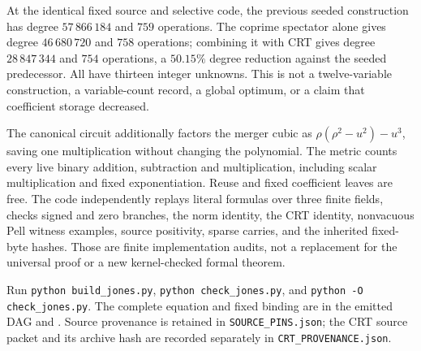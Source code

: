 At the identical fixed source and selective code, the previous seeded
construction has degree $57\,866\,184$ and $759$ operations. The coprime
spectator alone gives degree $46\,680\,720$ and $758$ operations; combining
it with CRT gives degree $28\,847\,344$ and $754$ operations, a $50.15\%$
degree reduction against the seeded predecessor. All have thirteen integer
unknowns. This is not a twelve-variable construction, a variable-count
record, a global optimum, or a claim that coefficient storage decreased.

The canonical circuit additionally factors the merger cubic as
$\rho(\rho^2-u^2)-u^3$, saving one multiplication without changing the
polynomial. The metric counts every live binary addition, subtraction and
multiplication, including scalar multiplication and fixed exponentiation.
Reuse and fixed coefficient leaves are free. The code independently replays
literal formulas over three finite fields, checks signed and zero branches,
the norm identity, the CRT identity, nonvacuous Pell witness examples, source
positivity, sparse carries, and the inherited fixed-byte hashes. Those are
finite implementation audits, not a replacement for the universal proof or
a new kernel-checked formal theorem.

Run \texttt{python build\_jones.py}, \texttt{python check\_jones.py}, and
\texttt{python -O check\_jones.py}. The complete equation and fixed binding
are in the emitted DAG and . Source provenance
is retained in \texttt{SOURCE\_PINS.json}; the CRT source packet and its
archive hash are recorded separately in \texttt{CRT\_PROVENANCE.json}.
